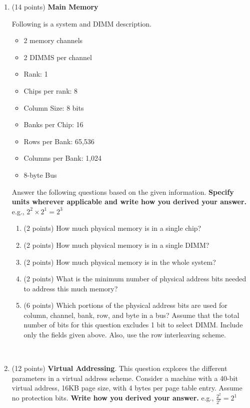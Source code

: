 \documentclass[a4paper,10pt]{article}
\begin{document}
\begin{enumerate}

\item (14 points) \textbf{Main Memory} 

Following is a system and DIMM description.
\begin{itemize}
    \item 2 memory channels
    \item 2 DIMMS per channel
    \item Rank: 1
    \item Chips per rank: 8
    \item Column Size: 8 bits
    \item Banks per Chip: 16
    \item Rows per Bank: 65,536
    \item Columns per Bank: 1,024
    \item 8-byte Bus
\end{itemize}

Answer the following questions based on the given information. \textbf{Specify units wherever applicable and write how you derived your answer.} e.g., ${2^2}\times{2^1}=2^3$
\begin{enumerate}
    \item (2 points) How much physical memory is in a single chip?
    \item (2 points) How much physical memory is in a single DIMM?
    \item (2 points) How much physical memory is in the whole system?
    \item (2 points) What is the minimum number of physical address bits needed to address this much memory?
    \item (6 points) Which portions of the physical address bits are used for column, channel, bank, row, and byte in a bus? Assume that the total number of bits for this question excludes 1 bit to select DIMM. Include only the fields given above. Also, use the row interleaving scheme.
    \newline

\end{enumerate}
\\

\item (12 points) \textbf{Virtual Addressing}. 
This question explores the different parameters in a virtual address scheme.
Consider a machine with a 40-bit virtual address, 16KB page size, with 4 bytes per page table entry. Assume no protection bits. \textbf{Write how you derived your answer.} e.g., $\frac{2^2}{2^1}=2^1$


\end{enumerate}
\end{document}
